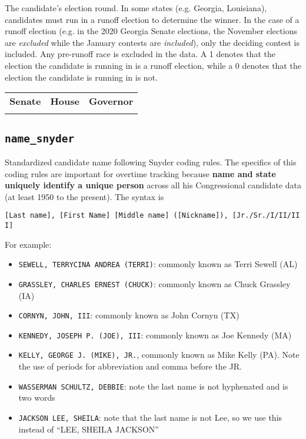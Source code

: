 \documentclass[12pt]{article}
\begin{document}
The candidate's election round. In some states (e.g. Georgia, Louisiana), candidates must run in a runoff election to determine the winner. In the case of a runoff election (e.g. in the 2020 Georgia Senate elections, the November elections are \textit{excluded} while the January contests are \textit{included}), only the deciding contest is included. Any pre-runoff race is excluded in the data. A 1 denotes that the election the candidate is running in is a runoff election, while a 0 denotes that the election the candidate is running in is not. 
\begin{table}[!h]
\begin{tabularx}{\linewidth}{CCC}
    \textbf{Senate} & \textbf{House} & \textbf{Governor}\\
     &  & 
\end{tabularx}
\end{table}


\FloatBarrier

\subsection*{\texttt{name\_snyder}}


Standardized candidate name following Snyder coding rules. The
specifics of this coding rules are important for overtime tracking because
\textbf{name and state uniquely identify a unique person} across all his
Congressional candidate data (at least 1950 to the present). The syntax
is

\texttt{{[}Last\ name{]},\ {[}First\ Name{]}\ {[}Middle\ name{]}\ ({[}Nickname{]}),\ {[}Jr./Sr./I/II/III{]}}

For example:

\begin{itemize}
\tightlist
\item
  \texttt{SEWELL,\ TERRYCINA\ ANDREA\ (TERRI)}: commonly known as Terri
  Sewell (AL)
\item
  \texttt{GRASSLEY,\ CHARLES\ ERNEST\ (CHUCK)}: commonly known as Chuck
  Grassley (IA)
\item
  \texttt{CORNYN,\ JOHN,\ III}: commonly known as John Cornyn (TX)
\item
  \texttt{KENNEDY,\ JOSEPH\ P.\ (JOE),\ III}: commonly known as Joe
  Kennedy (MA)
\item
  \texttt{KELLY,\ GEORGE\ J.\ (MIKE),\ JR.}, commonly known as Mike
  Kelly (PA). Note the use of periods for abbreviation and comma before
  the JR.
\item
  \texttt{WASSERMAN\ SCHULTZ,\ DEBBIE}: note the last name is not
  hyphenated and is two words
\item
  \texttt{JACKSON\ LEE,\ SHEILA}: note that the last name is not Lee, so
  we use this instead of ``LEE, SHEILA JACKSON''
\end{itemize}
\end{document}
